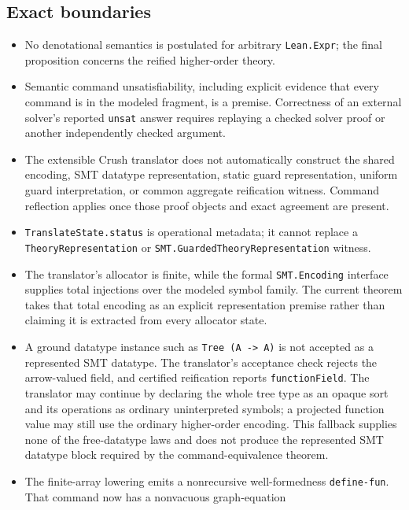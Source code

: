 \documentclass[11pt]{article}
\theoremstyle{remark}
\begin{document}
\subsection{Exact boundaries}

\begin{itemize}[leftmargin=*]
 \item No denotational semantics is postulated for arbitrary \texttt{Lean.Expr};
       the final proposition concerns the reified higher-order theory.
 \item Semantic command unsatisfiability, including explicit evidence that
       every command is in the modeled fragment, is a premise. Correctness of an
       external solver's reported \texttt{unsat} answer requires replaying a
       checked solver proof or another independently checked argument.
 \item The extensible Crush translator does not automatically construct the
       shared encoding, SMT datatype representation, static guard representation,
       uniform guard interpretation, or common aggregate reification witness.
       Command reflection applies once those proof objects and exact
       agreement are present.
 \item \texttt{TranslateState.status} is operational metadata; it cannot replace
       a \texttt{TheoryRepresentation} or \texttt{SMT.GuardedTheoryRepresentation} witness.
 \item The translator's allocator is finite, while the formal \texttt{SMT.Encoding}
       interface supplies total injections over the modeled symbol family. The
       current theorem takes that total encoding as an explicit representation
       premise rather than claiming it is extracted from every allocator state.
 \item A ground datatype instance such as \texttt{Tree (A -> A)} is not accepted
       as a represented SMT datatype. The translator's acceptance check rejects the
       arrow-valued field, and certified reification reports \texttt{functionField}. The translator
       may continue by declaring the whole tree type as an opaque sort and its
       operations as ordinary uninterpreted symbols; a projected function value
       may still use the ordinary higher-order encoding. This fallback supplies
       none of the free-datatype laws and does not produce the represented SMT
       datatype block required by the command-equivalence theorem.
 \item The finite-array lowering emits a nonrecursive well-formedness
       \texttt{define-fun}. That command now has a nonvacuous graph-equation

\end{itemize}
\end{document}
